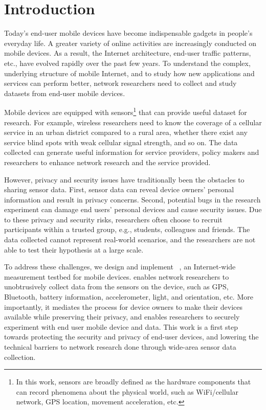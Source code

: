 \section{Introduction}
\label{sec:introduction}

Today's end-user mobile devices have become indispensable gadgets in people's 
everyday life. A greater variety of online activities are increasingly conducted on 
mobile devices. As a result, the Internet architecture, end-user 
traffic patterns, etc., have evolved rapidly over the past few years. To understand 
the complex, underlying structure of mobile Internet, and 
to study how new applications and services can perform better, network researchers 
need to collect and study datasets from end-user mobile devices. 

Mobile devices %
are equipped with sensors\footnote{In this work, sensors are broadly defined 
as the hardware components that can record phenomena about the physical 
world, such as WiFi/cellular network, GPS location, movement acceleration, etc.} 
that can provide useful dataset for research. 
For example, 
wireless researchers need to know the coverage of a cellular service in an urban 
district compared to a rural area, whether there exist any service blind spots
with weak cellular signal strength, and so on. The data collected
can generate useful information for service providers, policy 
makers and researchers to enhance network research and the service provided.

However, privacy and security issues have traditionally been the 
obstacles to sharing sensor data. First, sensor data can reveal device 
owners' personal information and result in privacy concerns. Second, potential 
bugs in the research experiment can damage end users' personal devices
and cause security issues. 
Due to these privacy and security risks, researchers often choose to recruit 
participants within a trusted group, e.g., students, colleagues and friends. 
The data collected cannot represent real-world scenarios, 
and the researchers are not able to test their hypothesis at a large scale. 

To address these challenges, we 
design and implement \sysname~\cite{sensibility}, an Internet-wide 
measurement testbed for mobile devices. \sysname enables network 
researchers to unobtrusively collect data 
from the sensors on the device, such as GPS, Bluetooth, battery information, 
accelerometer, light, and orientation, etc. More importantly, it
mediates the process for device owners to make their devices 
available while preserving their privacy, and enables researchers to 
securely experiment with end user mobile device and data. 
This work is a first step towards protecting the security and privacy of end-user 
devices, and lowering the technical barriers to network research done 
through wide-area sensor data collection. 